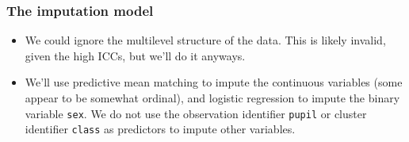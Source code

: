 \documentclass[
]{jss}
\begin{document}
\hypertarget{the-imputation-model}{%
\subsubsection{The imputation model}\label{the-imputation-model}}

\begin{itemize}
\item
  We could ignore the multilevel structure of the data. This is likely
  invalid, given the high ICCs, but we'll do it anyways.
\item
  We'll use predictive mean matching to impute the continuous variables
  (some appear to be somewhat ordinal), and logistic regression to
  impute the binary variable \texttt{sex}. We do not use the observation
  identifier \texttt{pupil} or cluster identifier \texttt{class} as
  predictors to impute other variables.
\end{itemize}
\end{document}
